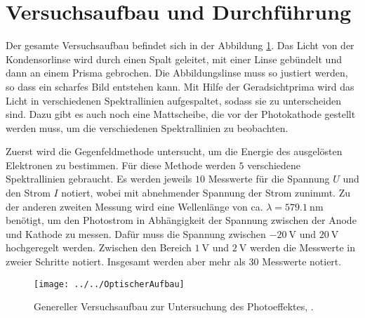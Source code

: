 \section{Versuchsaufbau und Durchführung}
\label{sec:Durchführung}
Der gesamte Versuchsaufbau befindet sich in der Abbildung \ref{fig:optischeraufbau}. Das Licht von der Kondensorlinse wird durch einen Spalt geleitet, mit einer Linse gebündelt und dann an einem Prisma gebrochen. Die Abbildungslinse muss so justiert werden, so dass ein scharfes Bild entstehen kann. Mit Hilfe der Geradsichtprima wird das Licht in verschiedenen Spektrallinien aufgespaltet, sodass sie zu unterscheiden sind. 
Dazu gibt es auch noch eine Mattscheibe, die vor der Photokathode gestellt werden muss, um die verschiedenen Spektrallinien zu beobachten. 

Zuerst wird die Gegenfeldmethode untersucht, um die Energie des ausgelösten Elektronen zu bestimmen. Für diese Methode werden $5$ verschiedene Spektrallinien gebraucht. Es werden jeweils $10$ Messwerte für die Spannung $U$ und den Strom $I$ notiert, wobei mit abnehmender Spannung der Strom zunimmt.
Zu der anderen zweiten Messung wird eine Wellenlänge von ca. $\lambda = \SI{579,1}{\nano\meter}$ benötigt, um den Photostrom in Abhängigkeit der Spannung zwischen der Anode und Kathode zu messen. Dafür muss die Spannung zwischen $\SI{-20}{\volt}$ und $\SI{+20}{\volt}$ hochgeregelt werden. Zwischen den Bereich $\SI{1}{\volt}$ und $\SI{2}{\volt}$ werden die Messwerte in zweier Schritte notiert. Insgesamt werden aber mehr als 30 Messwerte notiert.
\begin{figure}[h!]
	\centering
	\texttt{[image: ../../OptischerAufbau]}
	\caption{Genereller Versuchsaufbau zur Untersuchung des Photoeffektes, \cite[4]{anleitung500}.}
	\label{fig:optischeraufbau}
\end{figure}
